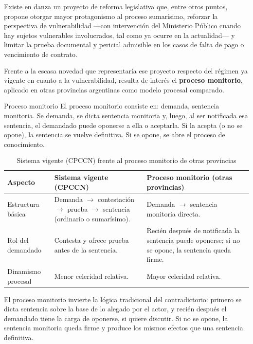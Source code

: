 \documentclass[12pt,oneside]{book}
\begin{document}
Existe en danza un proyecto de reforma legislativa que, entre otros puntos, propone otorgar mayor protagonismo al proceso sumarísimo, reforzar la perspectiva de vulnerabilidad ---con intervención del Ministerio Público cuando hay sujetos vulnerables involucrados, tal como ya ocurre en la actualidad--- y limitar la prueba documental y pericial admisible en los casos de falta de pago o vencimiento de contrato.

Frente a la escasa novedad que representaría ese proyecto respecto del régimen ya vigente en cuanto a la vulnerabilidad, resulta de interés el \textbf{proceso monitorio}, aplicado en otras provincias argentinas como modelo procesal comparado.

\begin{definition}{Proceso monitorio}
El proceso monitorio consiste en: demanda, sentencia monitoria. Se demanda, se dicta sentencia monitoria y, luego, al ser notificada esa sentencia, el demandado puede oponerse a ella o aceptarla. Si la acepta (o no se opone), la sentencia se vuelve definitiva. Si se opone, se abre el proceso de conocimiento.
\end{definition}

\begin{table}[H]
\centering
\caption{Sistema vigente (CPCCN) frente al proceso monitorio de otras provincias}
\begin{tabularx}{\textwidth}{>{\raggedright\arraybackslash}p{} X X}
\toprule
\textbf{Aspecto} & \textbf{Sistema vigente (CPCCN)} & \textbf{Proceso monitorio (otras provincias)} \\
\midrule
Estructura básica & Demanda $\rightarrow$ contestación $\rightarrow$ prueba $\rightarrow$ sentencia (ordinario o sumarísimo). & Demanda $\rightarrow$ sentencia monitoria directa. \\
Rol del demandado & Contesta y ofrece prueba antes de la sentencia. & Recién después de notificada la sentencia puede oponerse; si no se opone, la sentencia queda firme. \\
Dinamismo procesal & Menor celeridad relativa. & Mayor celeridad relativa. \\
\bottomrule
\end{tabularx}
\end{table}

\begin{important}
El proceso monitorio invierte la lógica tradicional del contradictorio: primero se dicta sentencia sobre la base de lo alegado por el actor, y recién después el demandado tiene la carga de oponerse, si quiere discutir. Si no se opone, la sentencia monitoria queda firme y produce los mismos efectos que una sentencia definitiva.
\end{important}
\end{document}

